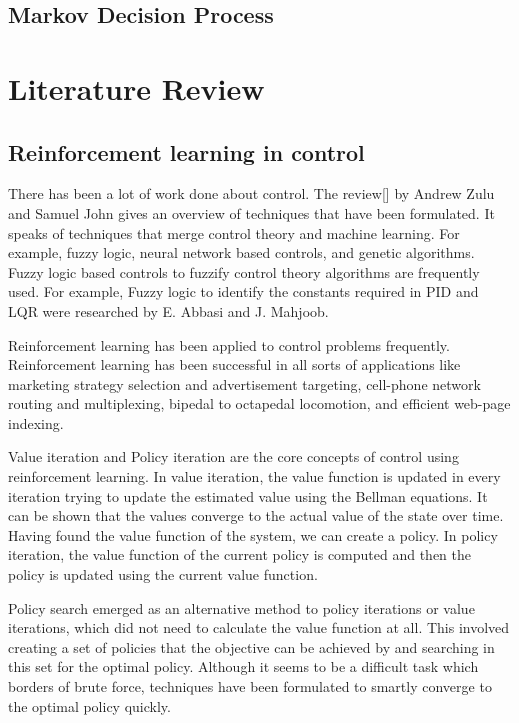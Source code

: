\documentclass[BTech]{iitmdiss}
\begin{document}
\section{Markov Decision Process}


\chapter{Literature Review}

\section{Reinforcement learning in control}

There has been a lot of work done about control. The review[] by Andrew Zulu and Samuel John gives an overview of techniques that have been formulated. It speaks of techniques that merge control theory and machine learning. For example, fuzzy logic, neural network based controls, and genetic algorithms. Fuzzy logic based controls to fuzzify control theory algorithms are frequently used. For example, Fuzzy logic to identify the constants required in PID and LQR were researched by E. Abbasi and J. Mahjoob.

Reinforcement learning has been applied to control problems frequently. Reinforcement learning has been successful in all sorts of applications like marketing strategy selection and advertisement targeting, cell-phone network routing and multiplexing, bipedal to octapedal locomotion, and efficient web-page indexing.

Value iteration and Policy iteration are the core concepts of control using reinforcement learning. In value iteration, the value function is updated in every iteration trying to update the estimated value using the Bellman equations. It can be shown that the values converge to the actual value of the state over time. Having found the value function of the system, we can create a policy. In policy iteration, the value function of the current policy is computed and then the policy is updated using the current value function.

Policy search emerged as an alternative method to policy iterations or value iterations, which did not need to calculate the value function at all. This involved creating a set of policies that the objective can be achieved by and searching in this set for the optimal policy. Although it seems to be a difficult task which borders of brute force, techniques have been formulated to smartly converge to the optimal policy quickly.
\end{document}
